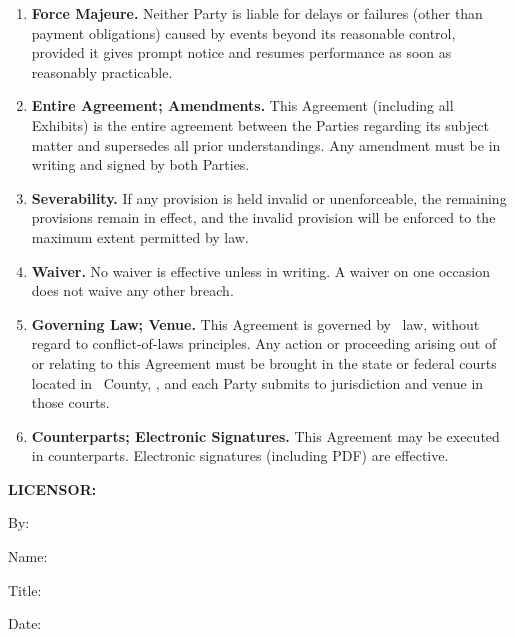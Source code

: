 \begin{enumerate}[leftmargin=*, label=\arabic*.]
\begin{enumerate}[leftmargin=*, label=\arabic{enumi}.\arabic*]
		\item \textbf{Force Majeure.} Neither Party is liable for delays or failures (other than
		payment obligations) caused by events beyond its reasonable control, provided it gives
		prompt notice and resumes performance as soon as reasonably practicable.

		\item \textbf{Entire Agreement; Amendments.} This Agreement (including all Exhibits) is
		the entire agreement between the Parties regarding its subject matter and supersedes all
		prior understandings. Any amendment must be in writing and signed by both Parties.

		\item \textbf{Severability.} If any provision is held invalid or unenforceable, the
		remaining provisions remain in effect, and the invalid provision will be enforced to the
		maximum extent permitted by law.

		\item \textbf{Waiver.} No waiver is effective unless in writing. A waiver on one occasion
		does not waive any other breach.

		\item \textbf{Governing Law; Venue.} This Agreement is governed by \companyState\ law,
		without regard to conflict-of-laws principles. Any action or proceeding arising out of or
		relating to this Agreement must be brought in the state or federal courts located in
		\venueCounty\ County, \companyState, and each Party submits to jurisdiction and venue in
		those courts.

		\item \textbf{Counterparts; Electronic Signatures.} This Agreement may be executed in
		counterparts. Electronic signatures (including PDF) are effective.
	\end{enumerate}

\end{enumerate}

\bigskip
\noindent\textbf{LICENSOR:}

\par\medskip\noindent By: \fillin[3in]\par
\par\smallskip\noindent Name: \licensorSignName\par
\par\smallskip\noindent Title: \licensorSignTitle\par
\par\smallskip\noindent Date: \fillin[3in]\par

